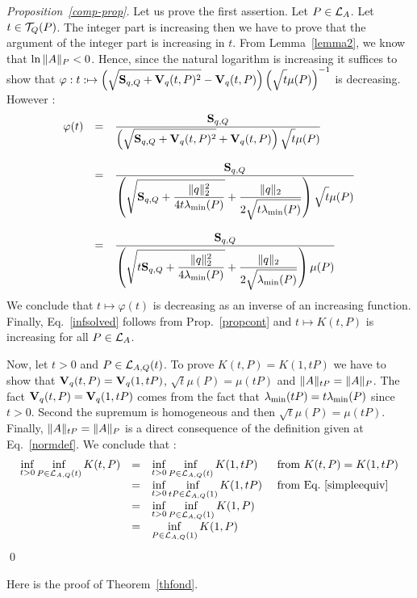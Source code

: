 \documentclass[10pt]{llncs}
\begin{document}
\begin{proof}[Proposition~\ref{comp-prop}]
Let us prove the first assertion.
Let $P\in\mathcal{L}_{A}$. Let $t\in\mathcal{T}_{Q}(P)$. The integer part is increasing then we have to prove that the argument of the integer part is increasing in $t$. From Lemma~\ref{lemma2}, we know that $\ln{\| A\|_P}<0$. Hence, since the natural logarithm is increasing it suffices to show that $\varphi:t:\mapsto \left(\sqrt{\strut \mathbf{S}_{q,Q}+\mathbf{V}_{q}(t,P)^2}-\mathbf{V}_{q}(t,P)\right)\left(\sqrt{\strut t}\mu(P)\right)^{-1}$ is decreasing. However :
\[
\begin{array}{lll}
\varphi(t)&=&\dfrac{\mathbf{S}_{q,Q}}{\left(\sqrt{\strut \mathbf{S}_{q,Q}+\mathbf{V}_{q}(t,P)^2}+\mathbf{V}_{q}(t,P)\right)\sqrt{\strut t}\mu(P)}\\
\\
&=&\dfrac{\mathbf{S}_{q,Q}}{\left(\sqrt{\strut \mathbf{S}_{q,Q}+\dfrac{\| q\|_2^2 }{4t\lambda_{\operatorname{min}}(P)}}+\dfrac{\| q\|_2 }{2\sqrt{\strut t\lambda_{\operatorname{min}}(P)}}\right)\sqrt{\strut t}\mu(P)}\\
\\
&=&\dfrac{\mathbf{S}_{q,Q}}{\left(\sqrt{\strut t\mathbf{S}_{q,Q}+\dfrac{\| q\|_2^2 }{4\lambda_{\operatorname{min}}(P)}}+\dfrac{\| q\|_2 }{2\sqrt{\strut \lambda_{\operatorname{min}}(P)}}\right)\mu(P)}
\end{array}
\]
We conclude that $t\mapsto \varphi(t)$ is decreasing as an inverse of an increasing function. 
Finally, Eq.~\eqref{infsolved} follows from Prop.~\ref{propcont} and $t\mapsto K(t,P)$ is increasing for all $P\in\mathcal{L}_{A}$.  

Now, let $t>0$ and $P\in\mathcal{L}_{A,Q}(t)$. To prove $K(t,P)=K(1,tP)$ we have to show that $\mathbf{V}_{q}(t,P)=\mathbf{V}_{q}(1,tP)$, $\sqrt{t}\mu(P)=\mu(tP)$
and $\| A\|_{tP}=\| A\|_P$. The fact $\mathbf{V}_{q}(t,P)=\mathbf{V}_{q}(1,tP)$ comes from the fact that $\lambda_{\operatorname{min}}(tP)=t\lambda_{\operatorname{min}}(P)$ since $t>0$. Second the supremum is homogeneous and then $\sqrt{t}\mu(P)=\mu(tP)$. Finally, $\| A\|_{tP}=\| A\|_P$ is a direct consequence of the definition given at Eq.~\eqref{normdef}. We conclude that :
\[
\begin{array}{llll}
\displaystyle{\inf_{t>0} \inf_{P\in\mathcal{L}_{A,Q}(t)} K(t,P)}&=&\displaystyle{\inf_{t>0} \inf_{P\in\mathcal{L}_{A,Q}(t)} K(1,tP)}& \text{ from } K(t,P)=K(1,tP)\\
&=&\displaystyle{\inf_{t>0} \inf_{tP\in\mathcal{L}_{A,Q}(1)} K(1,tP)}&\text{ from Eq.~\eqref{simpleequiv}} \\ 
&=&\displaystyle{\inf_{t>0} \inf_{P\in\mathcal{L}_{A,Q}(1)} K(1,P)}&\\
&=&\displaystyle{\inf_{P\in\mathcal{L}_{A,Q}(1)} K(1,P)}&
\end{array}
\]
\qed
\end{proof}

Here is the proof of Theorem~\ref{thfond}.
\end{document}

